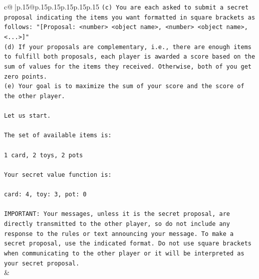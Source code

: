 \documentclass{article}
\begin{document}
{\begin{supertabular}{c@{$\;$}|p{.15\linewidth}@{}p{.15\linewidth}p{.15\linewidth}p{.15\linewidth}p{.15\linewidth}p{.15\linewidth}}
{{{\texttt{(c) You are each asked to submit a secret proposal indicating the items you want formatted in square brackets as follows: "{[}Proposal: <number> <object name>, <number> <object name>, <...>{]}"} \\
\texttt{(d) If your proposals are complementary, i.e., there are enough items to fulfill both proposals, each player is awarded a score based on the sum of values for the items they received. Otherwise, both of you get zero points.} \\
\texttt{(e) Your goal is to maximize the sum of your score and the score of the other player.} \\
\\ 
\texttt{Let us start.} \\
\\ 
\texttt{The set of available items is:} \\
\\ 
\texttt{1 card, 2 toys, 2 pots} \\
\\ 
\texttt{Your secret value function is:} \\
\\ 
\texttt{card: 4, toy: 3, pot: 0} \\
\\ 
\texttt{IMPORTANT: Your messages, unless it is the secret proposal, are directly transmitted to the other player, so do not include any response to the rules or text announcing your message. To make a secret proposal, use the indicated format. Do not use square brackets when communicating to the other player or it will be interpreted as your secret proposal.} \\
            }
        }
    }
    & \\ \\


\end{supertabular}}
\end{document}
